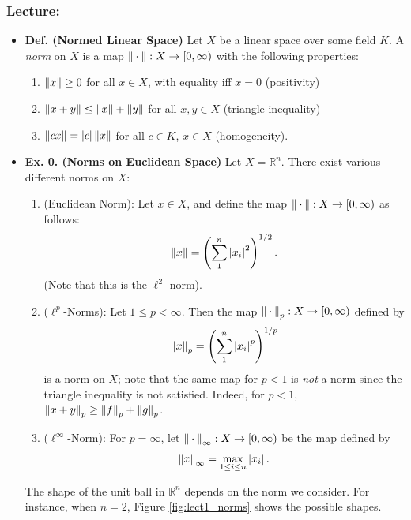 \documentclass{article}
\begin{document}
\subsubsection{Lecture:}
\begin{itemize}
	\item \textbf{Def. (Normed Linear Space)} Let $X$ be a linear space over some field $K$. A \textit{norm} on $X$ is a map $\left\Vert \hspace{2pt}\cdot\hspace{2pt} \right\Vert: X \to [0,\infty)$ with the following properties: 
	\begin{enumerate}[itemsep =-2pt,label = (\arabic{*})]
		\item $\left\Vert x \right\Vert \geq 0$ for all $x \in X$, with equality iff $x = 0$ (positivity)
		\item $\left\Vert x + y \right\Vert \leq \left\Vert x \right\Vert + \left\Vert y \right\Vert$ for all $x, y \in X$ (triangle inequality)
		\item $\left\Vert cx \right\Vert = \left| c \right|\left\Vert x \right\Vert$ for all $c \in K$, $x \in X$ (homogeneity).
	\end{enumerate}
	\item \textbf{Ex. 0. (Norms on Euclidean Space)} Let $X = \mathbb{R}^{n}$. There exist various different norms on $X$: 
	\begin{enumerate}[itemsep =-2pt, label = (\arabic{*})]
		\item (Euclidean Norm): Let $x \in X$, and define the map $\left\Vert \hspace{2pt}\cdot\hspace{2pt} \right\Vert: X \to [0, \infty)$ as follows: 
		\begin{equation}
			\left\Vert x \right\Vert = \left(\sum_{1}^{n}\left| x_{i} \right|^{2}\right)^{1/2}. 
		\end{equation}
		(Note that this is the $\ell^{2}$-norm). 
		\item ($\ell^{p}$-Norms): Let $1 \leq p < \infty$. Then the map $\left\Vert \hspace{2pt}\cdot\hspace{2pt} \right\Vert_{p}: X \to [0,\infty)$ defined by 
		\begin{equation}
			\left\Vert x \right\Vert_{p} = \left(\sum_{1}^{n}\left| x_{i} \right|^{p}\right)^{1/p}
		\end{equation}
		is a norm on $X$; note that the same map for $p < 1$ is \textit{not} a norm since the triangle inequality is not satisfied. Indeed, for $p < 1$, $\left\Vert x + y \right\Vert_{p} \geq \left\Vert f \right\Vert_{p} + \left\Vert g \right\Vert_{p}$. 
		\item ($\ell^{\infty}$-Norm): For $p = \infty$, let $\left\Vert \hspace{2pt}\cdot\hspace{2pt} \right\Vert_{\infty}: X \to [0,\infty)$ be the map defined by 
		\begin{equation}
			\left\Vert x \right\Vert_{\infty} = \max_{1 \leq i \leq n}\left| x_{i} \right|. 
		\end{equation}
	\end{enumerate}
	The shape of the unit ball in $\mathbb{R}^{n}$ depends on the norm we consider. For instance, when $n = 2$, Figure \ref{fig:lect1_norms} shows the possible shapes. 

\end{itemize}
\end{document}
